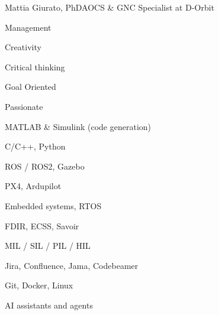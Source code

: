 \documentclass{article}
\begin{document}
\begin{cv}[avatar]{Mattia Giurato, PhD}{AOCS \& GNC Specialist at D-Orbit}
\cvseparator
\begin{cvitem}
    Management
\end{cvitem}

\begin{cvitem}
    Creativity
\end{cvitem}

\begin{cvitem}
    Critical thinking
\end{cvitem}

\cvseparator
\begin{cvitem}
    Goal Oriented
\end{cvitem}

\begin{cvitem}
    Passionate
\end{cvitem}


\cvseparator
\begin{cvitem}
    MATLAB \& Simulink (code generation)
\end{cvitem}

\begin{cvitem}
    C/C++, Python
\end{cvitem}

\begin{cvitem}
    ROS / ROS2, Gazebo
\end{cvitem}

\begin{cvitem}
    PX4, Ardupilot
\end{cvitem}

\begin{cvitem}
    Embedded systems, RTOS
\end{cvitem}

\cvseparator
\begin{cvitem}
    FDIR, ECSS, Savoir
\end{cvitem}

\begin{cvitem}
    MIL / SIL / PIL / HIL
\end{cvitem}

\begin{cvitem}
    Jira, Confluence, Jama, Codebeamer
\end{cvitem}

\begin{cvitem}
    Git, Docker, Linux
\end{cvitem}

\begin{cvitem}
    AI assistants and agents
\end{cvitem}


\end{cv}
\end{document}
